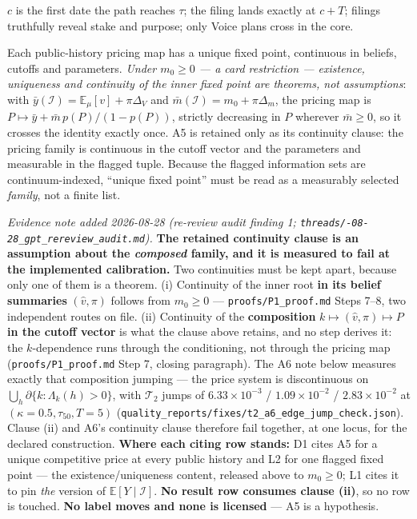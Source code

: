 \documentclass[11pt,a4paper]{article}
\newcommand{\Eop}{\mathbb{E}}
\newcommand{\Tmap}{\mathcal{T}}
\begin{document}
\begin{description}[leftmargin=1.9em,style=unboxed]
\item[A4 Legal-clock discipline.] $c$ is the first date the path reaches $\tau$;
  the filing lands exactly at $c+T$; filings truthfully reveal stake and purpose;
  only Voice plans cross in the core.

\item[A5 Inner pricing regularity, mostly demoted to a theorem.] Each public-history
  pricing map has a unique fixed point, continuous in beliefs, cutoffs and
  parameters. \emph{Under $m_0\ge0$ --- a card restriction --- existence, uniqueness
  and continuity of the inner fixed point are theorems, not assumptions}: with
  $\bar y(\mathcal I)=\Eop_\mu[v]+\pi\Delta_V$ and
  $\bar m(\mathcal I)=m_0+\pi\Delta_m$, the pricing map is
  $P\mapsto\bar y+\bar m\,p(P)/(1-p(P))$, strictly decreasing in $P$ wherever
  $\bar m\ge0$, so it crosses the identity exactly once. A5 is retained only as its
  continuity clause: the pricing family is continuous in the cutoff vector and the
  parameters and measurable in the flagged tuple. Because the flagged information
  sets are continuum-indexed, ``unique fixed point'' must be read as a measurably
  selected \emph{family}, not a finite list.

  \emph{Evidence note added 2026-08-28 (re-review audit finding 1;
  \texttt{threads/-08-28\_\allowbreak gpt\_\allowbreak rereview\_\allowbreak audit.md}).} \textbf{The retained
  continuity clause is an assumption about the \emph{composed} family, and it is measured
  to fail at the implemented calibration.} Two continuities must be kept apart, because
  only one of them is a theorem. (i) Continuity of the inner root \textbf{in its belief
  summaries} $(\hat v,\pi)$ follows from $m_0\ge0$ --- \texttt{proofs/P1\_proof.md}
  Steps 7--8, two independent routes on file. (ii) Continuity of the \textbf{composition}
  $k\mapsto(\hat v,\pi)\mapsto P$ \textbf{in the cutoff vector} is what the clause above
  retains, and no step derives it: the $k$-dependence runs through the conditioning, not
  through the pricing map (\texttt{proofs/P1\_proof.md} Step 7, closing paragraph). The A6
  note below measures exactly that composition jumping --- the price system is
  discontinuous on $\bigcup_h\partial\{k:\Lambda_k(h)>0\}$, with $\Tmap_2$ jumps of
  $6.33\times10^{-3}$ / $1.09\times10^{-2}$ / $2.83\times10^{-2}$ at
  $(\kappa{=}0.5,\tau_{50},T{=}5)$
  (\texttt{quality\_reports/\allowbreak fixes/\allowbreak t2\_a6\_edge\_jump\_check.json}).
  Clause (ii) and A6's continuity clause therefore fail together, at one locus, for the
  declared construction. \textbf{Where each citing row stands:} D1 cites A5 for a unique
  competitive price at every public history and L2 for one flagged fixed point --- the
  existence/uniqueness content, released above to $m_0\ge0$; L1 cites it to pin \emph{the}
  version of $\Eop[Y\mid\mathcal I]$. \textbf{No result row consumes clause (ii)}, so no
  row is touched. \textbf{No label moves and none is licensed} --- A5 is a hypothesis.


\end{description}
\end{document}
